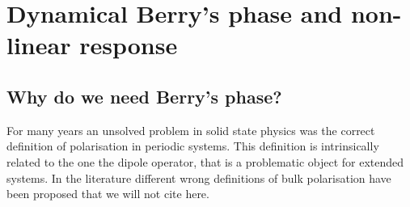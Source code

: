 \chapter{Dynamical Berry's phase and non-linear response} 
\label{chapterberry}
\section{Why do we need Berry's phase?}
For many years an unsolved problem in solid state physics was the correct definition of polarisation in periodic systems.
This definition is intrinsically related to the one the dipole operator, that is a problematic object for extended systems.
In the literature different wrong definitions of bulk polarisation have been proposed that we will not cite here\cite{restanotes}.
\label{polisolated}
